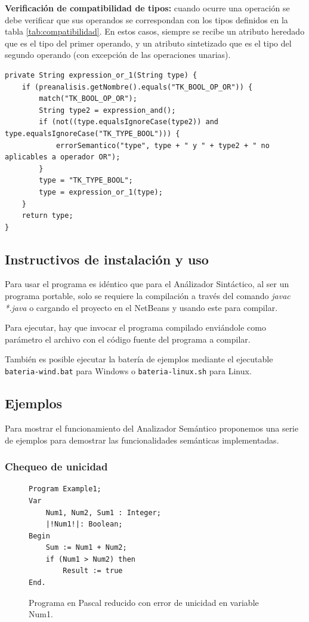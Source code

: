 \textbf{Verificación de compatibilidad de tipos:} cuando ocurre una operación se debe verificar que sus operandos se correspondan con los tipos definidos en la tabla \ref{tab:compatibilidad}. En estos casos, siempre se recibe un atributo heredado que es el tipo del primer operando, y un atributo sintetizado que es el tipo del segundo operando (con excepción de las operaciones unarias).

\begin{verbatim}
private String expression_or_1(String type) {
	if (preanalisis.getNombre().equals("TK_BOOL_OP_OR")) {
		match("TK_BOOL_OP_OR");
		String type2 = expression_and();
		if (not((type.equalsIgnoreCase(type2)) and type.equalsIgnoreCase("TK_TYPE_BOOL"))) {
			errorSemantico("type", type + " y " + type2 + " no aplicables a operador OR");
		}
		type = "TK_TYPE_BOOL";
		type = expression_or_1(type);
	}
	return type;
}
\end{verbatim}

\subsection{Instructivos de instalación y uso}
Para usar el programa es idéntico que para el Análizador Sintáctico, al ser un programa portable, solo se requiere la compilación a través del comando \emph{javac *.java} o cargando el proyecto en el NetBeans y usando este para compilar.

Para ejecutar, hay que invocar el programa compilado enviándole como parámetro el archivo con el código fuente del programa a compilar.

También es posible ejecutar la batería de ejemplos mediante el ejecutable \texttt{bateria-wind.bat} para Windows o \texttt{bateria-linux.sh} para Linux.

\subsection{Ejemplos}
Para mostrar el funcionamiento del Analizador Semántico proponemos una serie de ejemplos para demostrar las funcionalidades semánticas implementadas.

\subsubsection{Chequeo de unicidad}
\begin{figure}[H]
\begin{verbatim}
Program Example1;
Var       
    Num1, Num2, Sum1 : Integer;
    |!Num1!|: Boolean;
Begin
    Sum := Num1 + Num2;
    if (Num1 > Num2) then
        Result := true
End.
\end{verbatim}
\caption{Programa en Pascal reducido con error de unicidad en variable Num1.}
\label{fig:semantico_ej_error_1}
\end{figure}

